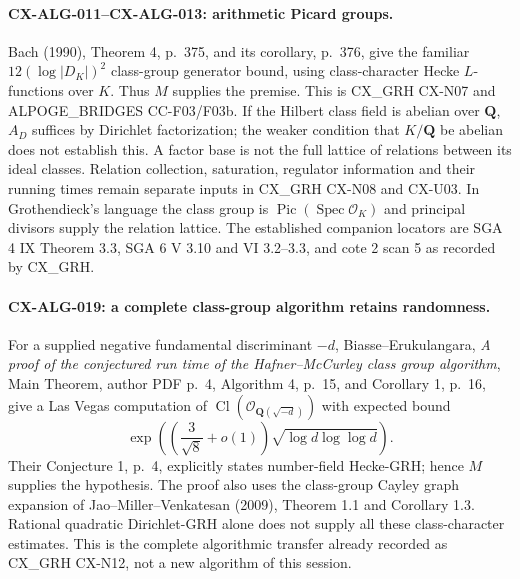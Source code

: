 \documentclass[11pt,a4paper]{article}
\begin{document}
\paragraph{CX-ALG-011--CX-ALG-013: arithmetic Picard groups.}
Bach (1990), Theorem 4, p.~375, and its corollary, p.~376, give the familiar
$12(\log|D_K|)^2$ class-group generator bound, using class-character Hecke
$L$-functions over $K$. Thus $M$ supplies the premise. This is CX\_GRH
CX-N07 and ALPOGE\_BRIDGES CC-F03/F03b. If the Hilbert class field is
abelian over $\mathbf Q$, $A_D$ suffices by Dirichlet factorization; the
weaker condition that $K/\mathbf Q$ be abelian does not establish this.
A factor base is not the full lattice of relations between its ideal
classes. Relation collection, saturation, regulator information and their
running times remain separate inputs in CX\_GRH CX-N08 and CX-U03.
In Grothendieck's language the class group is
$\operatorname{Pic}(\operatorname{Spec}\mathcal O_K)$ and principal divisors
supply the relation lattice. The established companion locators are SGA 4
IX Theorem 3.3, SGA 6 V 3.10 and VI 3.2--3.3, and cote 2 scan 5 as recorded
by CX\_GRH.

\paragraph{CX-ALG-019: a complete class-group algorithm retains randomness.}
For a supplied negative fundamental discriminant $-d$, Biasse--Erukulangara,
\emph{A proof of the conjectured run time of the Hafner--McCurley class
group algorithm}, Main Theorem, author PDF p.~4, Algorithm 4, p.~15,
and Corollary 1, p.~16, give a Las Vegas computation of
$\operatorname{Cl}(\mathcal O_{\mathbf Q(\sqrt{-d})})$ with expected bound
\[
 \exp\!\left(\left(\frac3{\sqrt8}+o(1)\right)
                         \sqrt{\log d\log\log d}\right).
\]
Their Conjecture 1, p.~4, explicitly states number-field Hecke-GRH; hence
$M$ supplies the hypothesis. The proof also uses the class-group Cayley
graph expansion of Jao--Miller--Venkatesan (2009), Theorem 1.1 and
Corollary 1.3. Rational quadratic Dirichlet-GRH alone does not supply all
these class-character estimates. This is the complete algorithmic transfer
already recorded as CX\_GRH CX-N12, not a new algorithm of this session.
\end{document}
